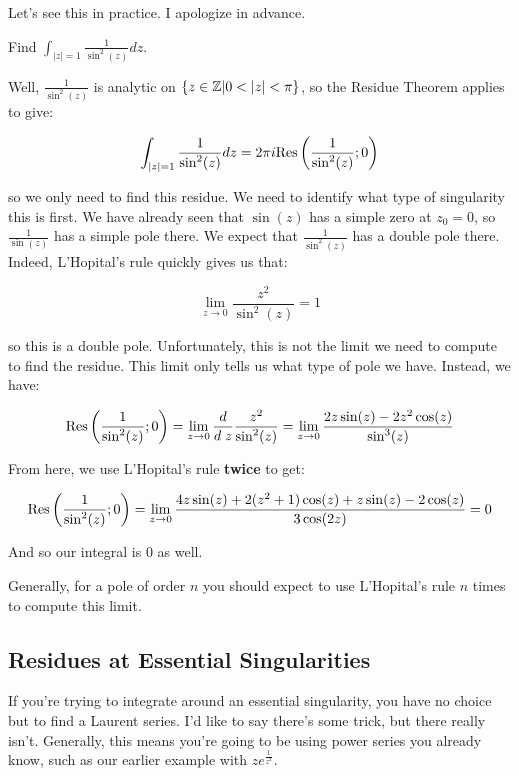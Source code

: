 Let's see this in practice. I apologize in advance.

\begin{ex}{}{} Find $\int_{|z| = 1} \frac{1}{\sin^2(z)}dz$.

Well, $\frac{1}{\sin^2(z)}$ is analytic on $\{z\in\Z|0<|z|< \pi\}$, so the Residue Theorem applies to give:

$$\int_{|z| = 1} \frac{1}{\sin^2(z)}dz = 2\pi i \mathrm{Res}\left(\frac{1}{\sin^2(z)};0\right)$$

\noin so we only need to find this residue. We need to identify what type of singularity this is first. We have already seen that $\sin(z)$ has a simple zero at $z_0 = 0$, so $\frac{1}{\sin(z)}$ has a simple pole there. We expect that $\frac{1}{\sin^2(z)}$ has a double pole there. Indeed, L'Hopital's rule quickly gives us that:

$$\lim_{z\rightarrow 0} \frac{z^2}{\sin^2(z)} = 1$$

\noin so this is a double pole. Unfortunately, this is not the limit we need to compute to find the residue. This limit only tells us what type of pole we have. Instead, we have:

$$\mathrm{Res}\left(\frac{1}{\sin^2(z)};0\right) = \lim_{z\rightarrow 0} \frac{d}{d\;z} \frac{z^2}{\sin^2(z)} = \lim_{z\rightarrow 0} \frac{2z\sin(z) - 2z^2\cos(z)}{\sin^3(z)}$$

From here, we use L'Hopital's rule {\bf twice} to get:

$$\mathrm{Res}\left(\frac{1}{\sin^2(z)};0\right) = \lim_{z\rightarrow 0} \frac{4z\sin(z) + 2(z^2  +1)\cos(z) + z\sin(z) - 2\cos(z)}{3\cos(2z)} = 0$$

And so our integral is $0$ as well.

\end{ex}

Generally, for a pole of order $n$ you should expect to use L'Hopital's rule $n$ times to compute this limit.


\subsection{Residues at Essential Singularities}

If you're trying to integrate around an essential singularity, you have no choice but to find a Laurent series. I'd like to say there's some trick, but there really isn't. Generally, this means you're going to be using power series you already know, such as our earlier example with $ze^{\frac{1}{z^2}}$.

